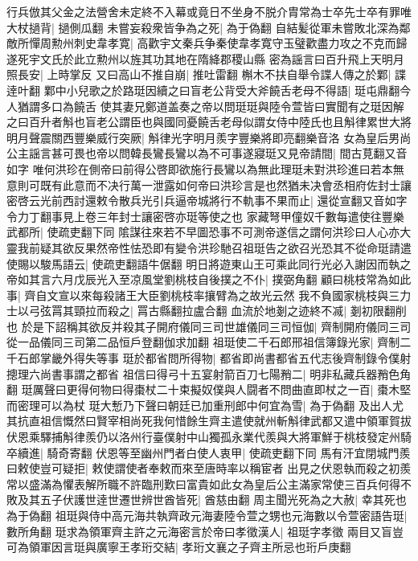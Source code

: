 行兵倣其父金之法營舍未定終不入幕或竟日不坐身不脱介胄常為士卒先士卒有罪唯大杖撾背|{
	撾側瓜翻}
未嘗妄殺衆皆争為之死|{
	為于偽翻}
自結髪從軍未嘗敗北深為鄰敵所憚周勲州刺史韋孝寛|{
	高歡宇文秦兵争秦使韋孝寛守玉璧歡盡力攻之不克而歸遂死宇文氏於此立勲州以旌其功其地在隋絳郡稷山縣}
密為謡言曰百升飛上天明月照長安|{
	上時掌反}
又曰高山不推自崩|{
	推吐雷翻}
槲木不扶自舉令諜人傳之於鄴|{
	諜逹叶翻}
鄴中小兒歌之於路珽因續之曰盲老公背受大斧饒舌老母不得語|{
	珽屯鼎翻今人猶謂多口為饒舌}
使其妻兄鄭道盖奏之帝以問珽珽與陸令萱皆曰實聞有之珽因解之曰百升者斛也盲老公謂臣也與國同憂饒舌老母似謂女侍中陸氏也且斛律累世大將明月聲震關西豐樂威行突厥|{
	斛律光字明月羨字豐樂將即亮翻樂音洛}
女為皇后男尚公主謡言甚可畏也帝以問韓長鸞長鸞以為不可事遂寢珽又見帝請間|{
	間古莧翻又音如字}
唯何洪珍在側帝曰前得公啓即欲施行長鸞以為無此理珽未對洪珍進曰若本無意則可既有此意而不决行萬一泄露如何帝曰洪珍言是也然猶未决會丞相府佐封士讓密啓云光前西討還敕令散兵光引兵逼帝城將行不軌事不果而止|{
	還從宣翻又音如字令力丁翻事見上卷三年封士讓密啓亦珽等使之也}
家藏弩甲僮奴千數每遣使往豐樂武都所|{
	使疏吏翻下同}
隂謀往來若不早圖恐事不可測帝遂信之謂何洪珍曰人心亦大靈我前疑其欲反果然帝性怯恐即有變令洪珍馳召祖珽告之欲召光恐其不從命珽請遣使賜以駿馬語云|{
	使疏吏翻語牛倨翻}
明日將遊東山王可乘此同行光必入謝因而執之帝如其言六月戊辰光入至凉風堂劉桃枝自後撲之不仆|{
	撲弼角翻}
顧曰桃枝常為如此事|{
	齊自文宣以來每殺諸王大臣劉桃枝率攘臂為之故光云然}
我不負國家桃枝與三力士以弓弦罥其頸拉而殺之|{
	罥古縣翻拉盧合翻}
血流於地剗之迹終不㓕|{
	剗初限翻削也}
於是下詔稱其欲反并殺其子開府儀同三司世雄儀同三司恒伽|{
	齊制開府儀同三司從一品儀同三司第二品恒戶登翻伽求加翻}
祖珽使二千石郎邢祖信簿錄光家|{
	齊制二千石郎掌畿外得失等事}
珽於都省問所得物|{
	都省即尚書都省五代志後齊制錄令僕射摠理六尚書事謂之都省}
祖信曰得弓十五宴射箭百刀七陽矟二|{
	明非私藏兵器矟色角翻}
珽厲聲曰更得何物曰得棗杖二十束擬奴僕與人闘者不問曲直即杖之一百|{
	棗木堅而密理可以為杖}
珽大慙乃下聲曰朝廷已加重刑郎中何宜為雪|{
	為于偽翻}
及出人尤其抗直祖信慨然曰賢宰相尚死我何惜餘生齊主遣使就州斬斛律武都又遣中領軍賀拔伏恩乘驛捕斛律羨仍以洛州行臺僕射中山獨孤永業代羨與大將軍鮮于桃枝發定州騎卒續進|{
	騎奇寄翻}
伏恩等至幽州門者白使人衷甲|{
	使疏吏翻下同}
馬有汗宜閉城門羨曰敕使豈可疑拒|{
	敕使謂使者奉敕而來至唐時率以稱宦者}
出見之伏恩執而殺之初羨常以盛滿為懼表解所職不許臨刑歎曰富貴如此女為皇后公主滿家常使三百兵何得不敗及其五子伏護世逹世遷世辨世酋皆死|{
	酋慈由翻}
周主聞光死為之大赦|{
	幸其死也為于偽翻}
祖珽與侍中高元海共執齊政元海妻陸令萱之甥也元海數以令萱密語告珽|{
	數所角翻}
珽求為領軍齊主許之元海密言於帝曰孝徵漢人|{
	祖珽字孝徵}
兩目又盲豈可為領軍因言珽與廣寧王孝珩交結|{
	孝珩文襄之子齊主所忌也珩戶庚翻}
